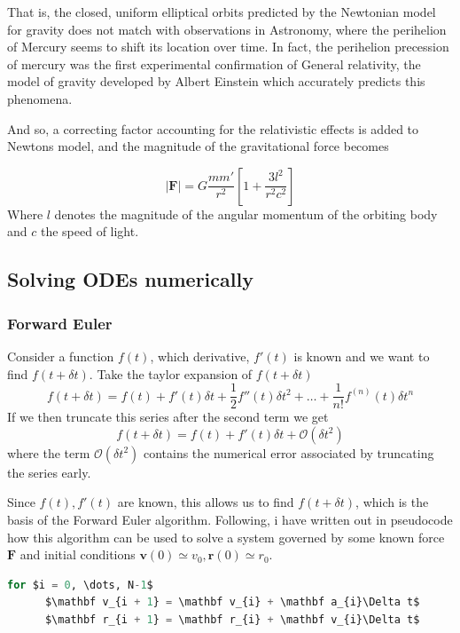 \documentclass[10pt,showpacs,preprintnumbers,footinbib,amsmath,amssymb,aps,prl,twocolumn,groupedaddress,superscriptaddress,showkeys]{revtex4-1}
\begin{document}
      That is, the closed, uniform elliptical orbits predicted by the Newtonian model for gravity does not match with observations in Astronomy, where the perihelion of Mercury seems to shift its location over time. In fact, the perihelion precession of mercury was the first experimental confirmation of General relativity, the model of gravity developed by Albert Einstein which accurately predicts this phenomena.

      And so, a correcting factor accounting for the relativistic effects is added to Newtons model, and the magnitude of the gravitational force becomes \cite{problem_set}

      \begin{equation}
        |\mathbf F| = G \frac{m m'}{r^2}\left[1 + \frac{3l^2}{r^2c^2}\right]
      \end{equation}
      Where $l$ denotes the magnitude of the angular momentum of the orbiting body and $c$ the speed of light.
\subsection{Solving ODEs numerically}
  \subsubsection{Forward Euler}
    Consider a function $f(t)$, which derivative, $f'(t)$ is known and we want to find $f(t + \delta t)$. 
    Take the taylor expansion of $f(t + \delta t)$
    \begin{equation}
      f(t + \delta t) = f(t) + f'(t)\delta t + \frac{1}{2}f''(t)\delta t^2 + \dots + \frac{1}{n!}f^{(n)}(t)\delta t^n
    \end{equation}
    If we then truncate this series after the second term we get
    \begin{equation}
      f(t + \delta t) = f(t) + f'(t)\delta t + \mathcal O(\delta t^2)
    \end{equation}
    where the term $\mathcal O(\delta t^2)$ contains the numerical error associated by truncating the series early.

    Since $f(t), f'(t)$ are known, this allows us to find $f(t + \delta t)$, which is the basis of the Forward Euler algorithm. Following, i have written out in pseudocode how this algorithm can be used to solve a system governed by some known force $\mathbf F$ and initial conditions $\mathbf v(0) \simeq v_0, \mathbf r(0) \simeq r_0$.

    \begin{lstlisting}[mathescape=true, language=python, title=Forward Euler Algorithm]
  for $i = 0, \dots, N-1$
      $\mathbf v_{i + 1} = \mathbf v_{i} + \mathbf a_{i}\Delta t$
      $\mathbf r_{i + 1} = \mathbf r_{i} + \mathbf v_{i}\Delta t$
  \end{lstlisting}
\end{document}
